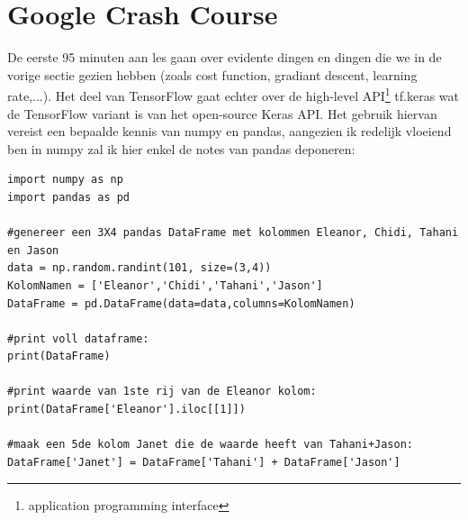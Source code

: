 \documentclass[10pt,a4paper,twoside]{article}
\begin{document}
\section{Google Crash Course}
De eerste 95 minuten aan les gaan over evidente dingen en dingen die we in de vorige sectie gezien hebben (zoals cost function, gradiant descent, learning rate,...). Het deel van TensorFlow gaat echter over de high-level API\footnote{application programming interface} tf.keras wat de TensorFlow variant is van het open-source Keras API. Het gebruik hiervan vereist een bepaalde kennis van numpy en pandas, aangezien ik redelijk vloeiend ben in numpy zal ik hier enkel de notes van pandas deponeren:
\begin{verbatim}
import numpy as np
import pandas as pd

#genereer een 3X4 pandas DataFrame met kolommen Eleanor, Chidi, Tahani en Jason
data = np.random.randint(101, size=(3,4))
KolomNamen = ['Eleanor','Chidi','Tahani','Jason']
DataFrame = pd.DataFrame(data=data,columns=KolomNamen)

#print voll dataframe:
print(DataFrame)

#print waarde van 1ste rij van de Eleanor kolom:
print(DataFrame['Eleanor'].iloc[[1]])

#maak een 5de kolom Janet die de waarde heeft van Tahani+Jason:
DataFrame['Janet'] = DataFrame['Tahani'] + DataFrame['Jason']                                                  
\end{verbatim}

\end{document}
